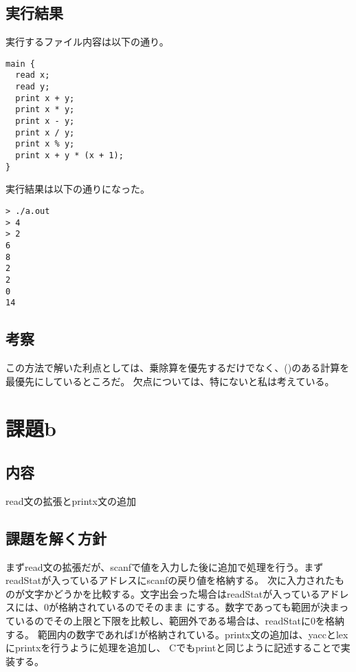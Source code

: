 \documentclass[a4paper,11pt]{jarticle}
\begin{document}
\subsection{実行結果}
実行するファイル内容は以下の通り。\\
\begin{verbatim}
main {
  read x;
  read y;
  print x + y;
  print x * y;
  print x - y;
  print x / y;
  print x % y;
  print x + y * (x + 1);
}
\end{verbatim}
実行結果は以下の通りになった。\\
\begin{verbatim}
> ./a.out
> 4
> 2
6
8
2
2
0
14
\end{verbatim}
\subsection{考察}
この方法で解いた利点としては、乗除算を優先するだけでなく、()のある計算を最優先にしているところだ。
欠点については、特にないと私は考えている。\\
\section{課題b}
\subsection{内容}
read文の拡張とprintx文の追加
\subsection{課題を解く方針}
まずread文の拡張だが、scanfで値を入力した後に追加で処理を行う。まずreadStatが入っているアドレスにscanfの戻り値を格納する。
次に入力されたものが文字かどうかを比較する。文字出会った場合はreadStatが入っているアドレスには、0が格納されているのでそのまま
にする。数字であっても範囲が決まっているのでその上限と下限を比較し、範囲外である場合は、readStatに0を格納する。
範囲内の数字であれば1が格納されている。printx文の追加は、yaccとlexにprintxを行うように処理を追加し、
Cでもprintと同じように記述することで実装する。\\
\end{document}
